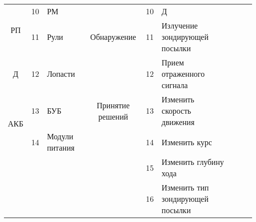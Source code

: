 \begin{landscape}
\begin{longtable}{|c|c|p{}||c|c|p{}||c|c|p{}|}
\multirow{2}{.1\textwidth}{РП}  & 10 &                                           РМ &                    &  10 &                                 Д &     &    &                                       \\\cline{1-6}
    & 11 &                                         Рули &        Обнаружение &  11 &     Излучение зондирующей посылки &     &    &                                       \\\cline{1-6}
  Д & 12 &                                      Лопасти &                    &  12 &         Прием отраженного сигнала &     &    &                                       \\\cline{1-6}
\multirow{2}{.1\textwidth}{АКБ} & 13 &                                          БУБ &   Принятие решений &  13 &        Изменить скорость движения &     &    &                                       \\\cline{1-6}
    & 14 &                               Модули питания &                    &  14 &                     Изменить курс &     &    &                                       \\\cline{1-6}
    &    &                                              &                    &  15 &             Изменить глубину хода &     &    &                                       \\\cline{4-6}
    &    &                                              &                    &  16 &  Изменить тип зондирующей посылки &     &    &                                       \\\cline{4-6}
\end{longtable}

\end{landscape}